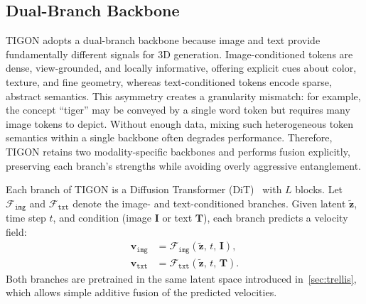 \subsection{Dual-Branch Backbone}

TIGON adopts a dual-branch backbone because image and text provide fundamentally different signals for 3D generation. Image-conditioned tokens are dense, view-grounded, and locally informative, offering explicit cues about color, texture, and fine geometry, whereas text-conditioned tokens encode sparse, abstract semantics. This asymmetry creates a granularity mismatch: for example, the concept ``tiger'' may be conveyed by a single word token but requires many image tokens to depict. Without enough data, mixing such heterogeneous token semantics within a single backbone often degrades performance. Therefore, TIGON retains two modality-specific backbones and performs fusion explicitly, preserving each branch's strengths while avoiding overly aggressive entanglement.


Each branch of TIGON is a Diffusion Transformer (DiT)~\cite{dit} with $L$ blocks. Let $\mathcal{F}_{\texttt{img}}$ and $\mathcal{F}_{\texttt{txt}}$ denote the image- and text-conditioned branches. Given latent $\tilde{\mathbf{z}}$, time step $t$, and condition (image $\mathbf{I}$ or text $\mathbf{T}$), each branch predicts a velocity field:
\begin{equation}
\begin{aligned}
    \mathbf{v}_{\texttt{img}} &= \mathcal{F}_{\texttt{img}}\!\left(\tilde{\mathbf{z}},\, t,\, \mathbf{I}\right),\\
    \mathbf{v}_{\texttt{txt}} &= \mathcal{F}_{\texttt{txt}}\!\left(\tilde{\mathbf{z}},\, t,\, \mathbf{T}\right).
\end{aligned}
\end{equation}
Both branches are pretrained in the same latent space introduced in~\cref{sec:trellis}, which allows simple additive fusion of the predicted velocities.

